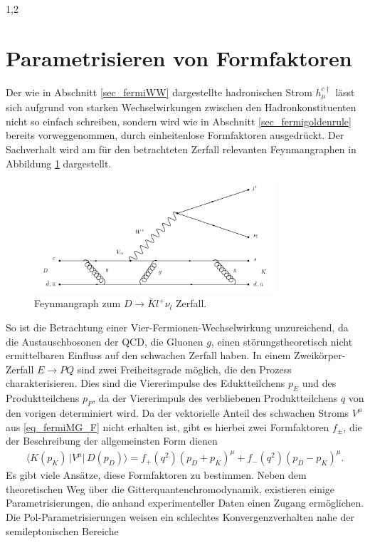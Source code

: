\documentclass[11pt,a4paper,twoside]{report}
\begin{document}
\begin{spacing}{1,2}
\section{Parametrisieren von Formfaktoren}
\label{sec_paramForm}
Der wie in Abschnitt \ref{sec_fermiWW} dargestellte hadronischen Strom $h_\mu^{c\dagger}$ lässt sich aufgrund von starken Wechselwirkungen zwischen den 
Hadronkonstituenten nicht so einfach schreiben, sondern wird wie in Abschnitt \ref{sec_fermigoldenrule} bereits vorweggenommen, durch einheitenlose Formfaktoren 
ausgedrückt\cite{KimPham}. Der Sachverhalt wird am für den betrachteten Zerfall relevanten Feynmangraphen in Abbildung \ref{pic_Dfeyn} dargestellt.
\begin{figure}[H]
\includegraphics[width=0.8\textwidth]{Abbildungen/DFeyn.png}
\caption{Feynmangraph zum $D\rightarrow \bar K l^+ \nu_l$ Zerfall.}
\label{pic_Dfeyn}
\end{figure}
\noindent
So ist die Betrachtung einer Vier-Fermionen-Wechselwirkung unzureichend, da die Austauschbosonen der QCD, die Gluonen $g$, einen störungstheoretisch nicht
ermittelbaren Einfluss auf den schwachen Zerfall haben.
In einem Zweikörper-Zerfall $E\rightarrow PQ$ sind zwei Freiheitsgrade möglich, die den Prozess charakterisieren. Dies sind die Viererimpulse des Eduktteilchens
$p_E$ und des Produktteilchens $p_P$, da der Viererimpuls des verbliebenen Produktteilchens $q$ von den vorigen determiniert wird. Da der vektorielle 
Anteil des schwachen Stroms $V^\mu$ aus \eqref{eq_fermiMG_F} nicht erhalten ist, gibt es hierbei zwei Formfaktoren $f_\pm$, die der 
Beschreibung der allgemeinsten Form dienen
\begin{align}
 \big\langle K(p_K)\,\big|V^\mu\big|\, D(p_D)\big\rangle = f_+(q^2)(p_D+p_K)^\mu + f_-(q^2)(p_D-p_K)^\mu.
\end{align}
Es gibt viele Ansätze, diese Formfaktoren zu bestimmen. Neben dem theoretischen Weg über die Gitterquantenchromodynamik, existieren einige Parametrisierungen,
die anhand experimenteller Daten einen Zugang ermöglichen. Die Pol-Parametrisierungen weisen ein schlechtes Konvergenzverhalten nahe der semileptonischen Bereiche

\end{spacing}
\end{document}
